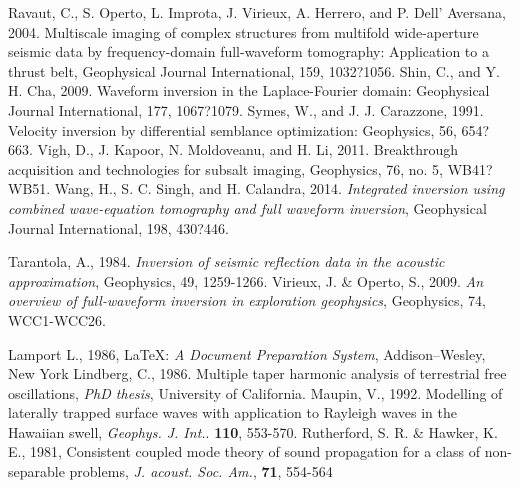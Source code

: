 \documentclass{gji}
\begin{document}
\begin{thebibliography}{}
 Ravaut, C., S. Operto, L. Improta, J. Virieux, A. Herrero, and P. Dell' Aversana, 2004. Multiscale imaging of complex structures from multifold wide-aperture seismic data by frequency-domain full-waveform tomography: Application to a thrust belt, Geophysical Journal International, 159, 1032?1056.
 Shin, C., and Y. H. Cha, 2009. Waveform inversion in the Laplace-Fourier domain: Geophysical Journal International, 177, 1067?1079.
 Symes, W., and J. J. Carazzone, 1991. Velocity inversion by differential semblance optimization: Geophysics, 56, 654?663.
 Vigh, D., J. Kapoor, N. Moldoveanu, and H. Li, 2011. Breakthrough acquisition and technologies for subsalt imaging, Geophysics, 76, no. 5, WB41?WB51.
 Wang, H., S. C. Singh, and H. Calandra, 2014. \textit{Integrated inversion using combined wave-equation tomography and full waveform inversion}, Geophysical Journal International, 198, 430?446.


  

   Tarantola, A., 1984. \textit{Inversion of seismic reflection data in the acoustic approximation}, Geophysics, 49, 1259-1266.
    Virieux, J. \& Operto, S., 2009. \textit{An overview of full-waveform inversion in exploration geophysics}, Geophysics, 74, WCC1-WCC26.

    Lamport L., 1986,  \LaTeX: \textit{A Document
    Preparation System}, Addison--Wesley, New York
    Lindberg, C., 1986.  Multiple taper harmonic analysis of
    terrestrial free oscillations, \textit{PhD thesis},
    University of California.
    Maupin, V., 1992. Modelling of laterally trapped surface
    waves with application to Rayleigh waves in the Hawaiian
    swell, \textit{Geophys. J. Int.}. \textbf{110}, 553-570.
    Rutherford, S. R. \& Hawker, K. E., 1981,
    Consistent coupled mode theory of sound propagation for a
    class of non-separable problems,
   \textit{J. acoust. Soc. Am.}, \textbf{71}, 554-564
\end{thebibliography}
\end{document}
